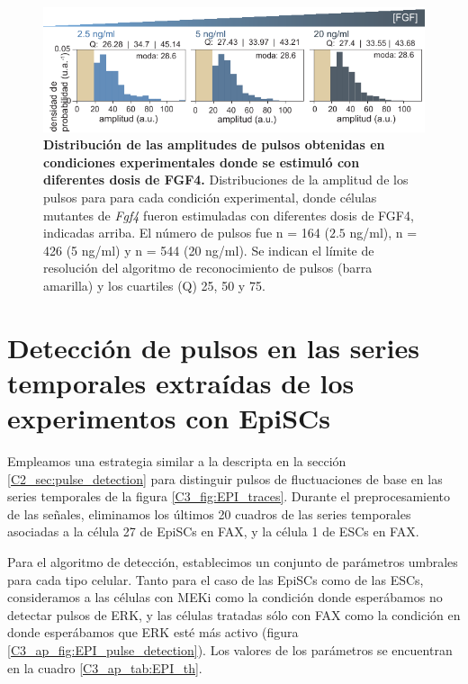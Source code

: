 \documentclass[./main.tex]{subfiles}
\begin{document}
\begin{subappendices}
\begin{figure}
    \centering
    \includegraphics[width=1\columnwidth]{figures/chapter3/C3_FGF_amplitud.pdf}
    \caption{ \textbf{Distribución de las amplitudes de pulsos obtenidas en condiciones experimentales donde se estimuló con diferentes dosis de FGF4.} Distribuciones de la amplitud de los pulsos para para cada condición experimental, donde células mutantes de \textit{Fgf4} fueron estimuladas con diferentes dosis de FGF4, indicadas arriba. El número de pulsos fue n = 164 ($2.5$ ng/ml), n = 426 (5 ng/ml) y n = 544 (20 ng/ml). Se indican el límite de resolución del algoritmo de reconocimiento de pulsos (barra amarilla) y los cuartiles (Q) 25, 50 y 75. }
    \label{C3_fig:FGF_amplitud}
\end{figure}


\section{Detección de pulsos en las series temporales extraídas de los experimentos con EpiSCs}
\label{C3_ap:EPI_pulse_detection}


Empleamos una estrategia similar a la descripta en la sección \ref{C2_sec:pulse_detection} para distinguir pulsos de fluctuaciones de base en las series temporales de la figura \ref{C3_fig:EPI_traces}. Durante el preprocesamiento de las señales, eliminamos los últimos 20 cuadros de las series temporales asociadas a la célula 27 de EpiSCs en FAX, y la célula 1 de ESCs en FAX.  


Para el algoritmo de detección, establecimos un conjunto de  parámetros umbrales para cada tipo celular. Tanto para el caso de las EpiSCs como de las ESCs, consideramos a las células con MEKi como la condición donde esperábamos no detectar pulsos de ERK, y las células tratadas sólo con FAX como la condición en donde esperábamos que ERK esté más activo (figura \ref{C3_ap_fig:EPI_pulse_detection}). Los valores de los parámetros se encuentran en la cuadro \ref{C3_ap_tab:EPI_th}.


\end{subappendices}
\end{document}
